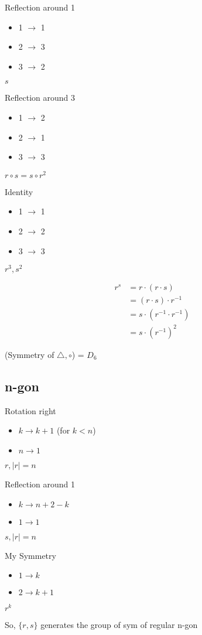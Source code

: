 \begin{multicols}{3}
Reflection around 1
\begin{itemize}
  \item 1 $\rightarrow$ 1
  \item 2 $\rightarrow$ 3
  \item 3 $\rightarrow$ 2
\end{itemize}
$s$

\par
Reflection around 3
\begin{itemize}
  \item 1 $\rightarrow$ 2
  \item 2 $\rightarrow$ 1
  \item 3 $\rightarrow$ 3
\end{itemize}
$r \circ s = s \circ r^2$
\par
Identity 
\begin{itemize}
  \item 1 $\rightarrow$ 1
  \item 2 $\rightarrow$ 2
  \item 3 $\rightarrow$ 3
\end{itemize}
$r^3, s^2$
\end{multicols}
\begin{align}
  r^s &= r\cdot(r\cdot s) \\ 
  &= (r\cdot s) \cdot r^{-1} \\
  &= s \cdot (r^{-1} \cdot r^{-1}) \\
  &= s \cdot (r^{-1})^2
\end{align}



(Symmetry of $\triangle, \circ$) = $D_6$
\pagebreak
\subsection{n-gon}


\begin{multicols}{3}
Rotation right
\begin{itemize}
  \item $k \rightarrow k + 1$ (for $k < n$)
  \item $n \rightarrow 1$
\end{itemize}
$r, |r| = n$
\par
Reflection around 1
\begin{itemize}
  \item $k \rightarrow n + 2 - k$
  \item $1 \rightarrow 1$
\end{itemize}
$s, |r| = n$
\par
My Symmetry
\begin{itemize}
  \item $1 \rightarrow k$
  \item $2 \rightarrow k + 1$
\end{itemize}
$r^k$
\end{multicols}
So, $\{r, s\}$ generates the group of sym of regular n-gon


